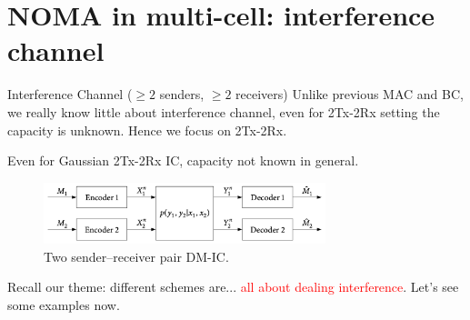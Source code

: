 \documentclass[aspectratio=43, 10pt]{beamer}
\begin{document}
\section{NOMA in multi-cell: interference channel}
    \begin{frame}{Interference Channel \small ($\geq2$ senders, $\geq 2$ receivers)}
        Unlike previous MAC and BC, we really know little about interference channel, even for 2Tx-2Rx setting the capacity is unknown. Hence we focus on 2Tx-2Rx. 

        \vfill
        Even for Gaussian 2Tx-2Rx IC, capacity not known in general. 

        \begin{figure}
            \centering
                \includegraphics[width=0.73\textwidth]{figures/2t2rIC.png}
                \caption{Two sender–receiver pair DM-IC.}
        \end{figure}
        
        \vfill
        Recall our theme: different schemes are... \textcolor{red}{all about dealing interference}. Let's see some examples now.
    \end{frame}
\end{document}
